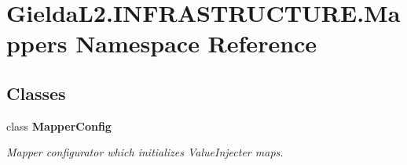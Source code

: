 \hypertarget{namespace_gielda_l2_1_1_i_n_f_r_a_s_t_r_u_c_t_u_r_e_1_1_mappers}{}\section{Gielda\+L2.\+I\+N\+F\+R\+A\+S\+T\+R\+U\+C\+T\+U\+R\+E.\+Mappers Namespace Reference}
\label{namespace_gielda_l2_1_1_i_n_f_r_a_s_t_r_u_c_t_u_r_e_1_1_mappers}
\subsection*{Classes}
\begin{DoxyCompactItemize}
\item 
class {\bfseries Mapper\+Config}
\begin{DoxyCompactList}\small\item\em Mapper configurator which initializes Value\+Injecter maps. \end{DoxyCompactList}\end{DoxyCompactItemize}
